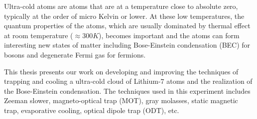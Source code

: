 %
%
%
Ultra-cold atoms are atoms that are at a temperature close to absolute zero, typically at the order of micro Kelvin or lower. At these low temperatures, the quantum properties of the atoms, which are usually dominated by thermal effect at room temperature ($\approx300K$), becomes important and the atoms can form interesting new states of matter including Bose-Einstein condensation (BEC) for bosons and degenerate Fermi gas for fermions.

This thesis presents our work on developing and improving the techniques of trapping and cooling a ultra-cold cloud of Lithium-$7$ atoms and the realization of the Bose-Einstein condensation. The techniques used in this experiment includes Zeeman slower, magneto-optical trap (MOT), gray molasses, static magnetic trap, evaporative cooling, optical dipole trap (ODT), etc.
